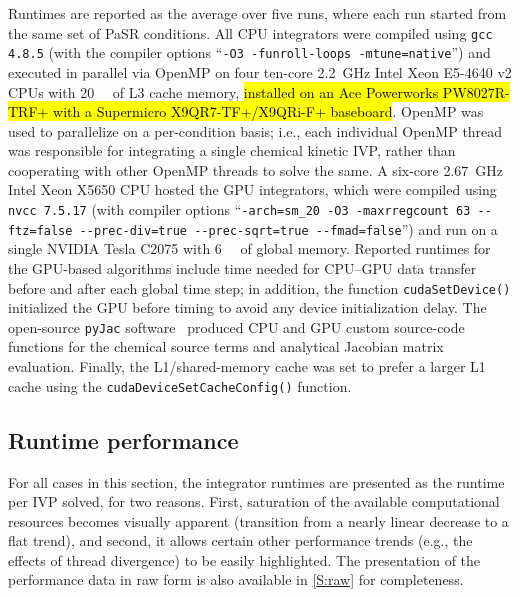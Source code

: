 \documentclass[preprint,review,11pt]{elsarticle}
\DeclareRobustCommand{\hlb}[1]{\sethlcolor{SkyBlue}\hl{#1}}
\begin{document}
Runtimes are reported as the average over five runs, where each run started from the same set of PaSR conditions.
All CPU integrators were compiled using \texttt{gcc 4.8.5} (with the compiler options ``\texttt{-O3 -funroll-loops -mtune=native}'') and executed in parallel via OpenMP on four ten-core \SI{2.2}{\giga\hertz} Intel Xeon E5-4640 v2 CPUs with \SI{20}{\mega\byte} of L3 cache memory, \hlb{installed on an Ace Powerworks PW8027R-TRF+ with a Supermicro X9QR7-TF+/X9QRi-F+ baseboard}.
OpenMP was used to parallelize on a per-condition basis; i.e., each individual OpenMP thread was responsible for integrating a single chemical kinetic IVP, rather than cooperating with other OpenMP threads to solve the same.
A six-core \SI{2.67}{\giga\hertz} Intel Xeon X5650 CPU hosted the GPU integrators, which were compiled using \texttt{nvcc 7.5.17} (with compiler options ``\texttt{-arch=sm\_20 -O3 -maxrregcount 63 -{}-ftz=false -{}-prec-div=true -{}-prec-sqrt=true -{}-fmad=false}'') and run on a single NVIDIA Tesla C2075 with \SI{6}{\giga\byte} of global memory.
Reported runtimes for the GPU-based algorithms include time needed for CPU--GPU data transfer before and after each global time step; in addition, the function \texttt{cudaSetDevice()} initialized the GPU before timing to avoid any device initialization delay.
The open-source \texttt{pyJac} software~\cite{niemeyer_2016_51139,Niemeyer:2015ws,Niemeyer:2016aa} produced CPU and GPU custom source-code functions for the chemical source terms and analytical Jacobian matrix evaluation.
Finally, the L1\slash shared-memory cache was set to prefer a larger L1 cache using the \texttt{cudaDeviceSetCacheConfig()} function.

\subsection{Runtime performance}
\label{S:perf}

For all cases in this section, the integrator runtimes are presented as the runtime per IVP solved, for two reasons.
First, saturation of the available computational resources becomes visually apparent (transition from a nearly linear decrease to a flat trend), and second, it allows certain other performance trends (e.g., the effects of thread divergence) to be easily highlighted.
The presentation of the performance data in raw form is also available in \ref{S:raw} for completeness.
\end{document}
